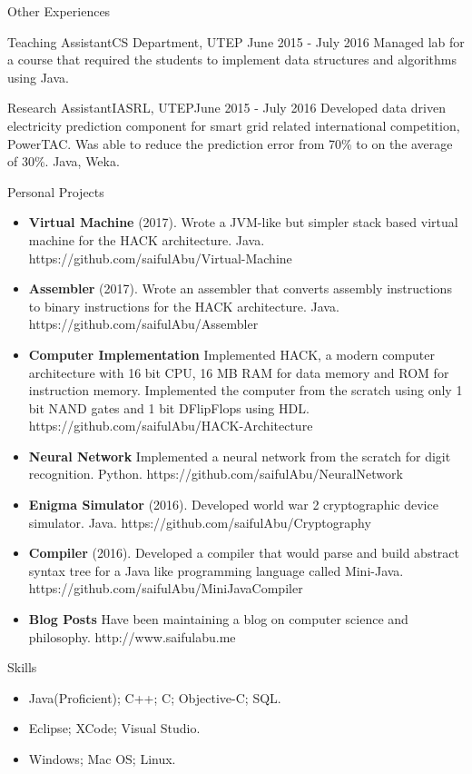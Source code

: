 \documentclass[]{mcdowellcv}
\begin{document}
	\begin{cvsection}{Other Experiences}
		\begin{cvsubsection}{Teaching Assistant}{CS Department, UTEP }{June 2015 - July 2016}
			Managed lab for a course that required the students to implement data structures and algorithms using Java.
		\end{cvsubsection}
		\begin{cvsubsection}{Research Assistant}{IASRL, UTEP}{June 2015 - July 2016}
			Developed data driven electricity prediction component for smart grid related international competition, PowerTAC. Was able to reduce the prediction error from 70\% to on the average of 30\%. Java, Weka.
		\end{cvsubsection}
	\end{cvsection}
	
	\begin{cvsection}{Personal Projects}
		\begin{cvsubsection}{}{}{}
			\begin{itemize}
				\item \textbf{Virtual Machine} (2017). Wrote a JVM-like but simpler stack based virtual machine for the HACK architecture. Java. https://github.com/saifulAbu/Virtual-Machine 
				\item \textbf{Assembler} (2017). Wrote an assembler that converts assembly instructions to binary instructions for the HACK architecture. Java. https://github.com/saifulAbu/Assembler
				\item\textbf{Computer Implementation} Implemented HACK, a modern computer architecture with 16 bit CPU, 16 MB RAM for data memory and ROM for instruction memory. Implemented the computer from the scratch using only 1 bit NAND gates and 1 bit DFlipFlops using HDL. https://github.com/saifulAbu/HACK-Architecture
				\item \textbf{Neural Network} Implemented a neural network from the scratch for digit recognition. Python. https://github.com/saifulAbu/NeuralNetwork 
				\item \textbf{Enigma Simulator} (2016).  Developed world war 2 cryptographic device simulator.  Java. https://github.com/saifulAbu/Cryptography
				\item \textbf{Compiler} (2016). Developed a compiler that would parse and build abstract syntax tree for a Java like programming language called Mini-Java. https://github.com/saifulAbu/MiniJavaCompiler
				\item \textbf{Blog Posts} Have been maintaining a blog on computer science and philosophy. http://www.saifulabu.me  
			\end{itemize}
		\end{cvsubsection}
	\end{cvsection}
	
	\begin{cvsection}{Skills}
		\begin{cvsubsection}{}{}{}	
			\begin{itemize}
				\item Java(Proficient); C++; C; Objective-C; SQL.  
				\item Eclipse; XCode; Visual Studio.
				\item Windows; Mac OS; Linux. 
			\end{itemize}
		\end{cvsubsection}
	\end{cvsection}
	
\end{document}

